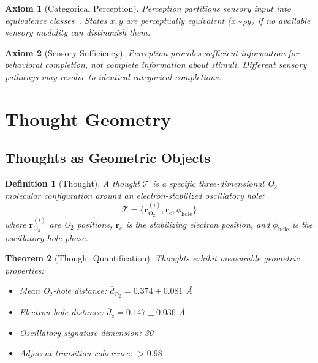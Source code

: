 \documentclass[aps,prd,twocolumn,superscriptaddress,floatfix,nofootinbib]{revtex4-2}
\newtheorem{theorem}{Theorem}[section]
\newtheorem{definition}[theorem]{Definition}
\newtheorem{axiom}{Axiom}
\theoremstyle{remark}
\newcommand{\Tcat}{\mathcal{T}}
\begin{document}
\begin{axiom}[Categorical Perception]
\label{ax:categorical_perception}
Perception partitions sensory input into equivalence classes~\cite{harnad1987categorical,goldstone1998perceptual}. States $x, y$ are perceptually equivalent ($x \sim_P y$) if no available sensory modality can distinguish them.
\end{axiom}

\begin{axiom}[Sensory Sufficiency]
\label{ax:sufficiency}
Perception provides \emph{sufficient} information for behavioral completion, not \emph{complete} information about stimuli. Different sensory pathways may resolve to identical categorical completions.
\end{axiom}

\section{Thought Geometry}
\label{sec:thought}

\subsection{Thoughts as Geometric Objects}

\begin{definition}[Thought]
\label{def:thought}
A thought $\Tcat$ is a specific three-dimensional O$_2$ molecular configuration around an electron-stabilized oscillatory hole:
\begin{equation}
\Tcat = \{\mathbf{r}_{\mathrm{O}_2}^{(i)}, \mathbf{r}_e, \phi_{\mathrm{hole}}\}
\end{equation}
where $\mathbf{r}_{\mathrm{O}_2}^{(i)}$ are O$_2$ positions, $\mathbf{r}_e$ is the stabilizing electron position, and $\phi_{\mathrm{hole}}$ is the oscillatory hole phase.
\end{definition}

\begin{theorem}[Thought Quantification]
\label{thm:thought_geometry}
Thoughts exhibit measurable geometric properties:
\begin{itemize}
\item Mean O$_2$-hole distance: $\bar{d}_{\mathrm{O}_2} = 0.374 \pm 0.081$ \AA
\item Electron-hole distance: $\bar{d}_e = 0.147 \pm 0.036$ \AA
\item Oscillatory signature dimension: 30
\item Adjacent transition coherence: $> 0.98$
\end{itemize}
\end{theorem}
\end{document}
